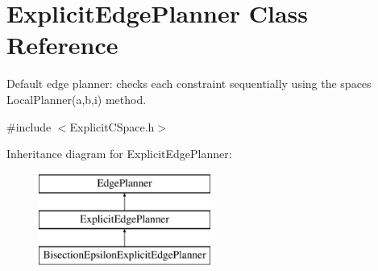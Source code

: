 \section{Explicit\+Edge\+Planner Class Reference}
\label{classExplicitEdgePlanner}


Default edge planner\+: checks each constraint sequentially using the space\textquotesingle{}s Local\+Planner(a,b,i) method.  




{\ttfamily \#include $<$Explicit\+C\+Space.\+h$>$}

Inheritance diagram for Explicit\+Edge\+Planner\+:\begin{figure}[H]
\begin{center}
\leavevmode
\includegraphics[height=3.000000cm]{classExplicitEdgePlanner}
\end{center}
\end{figure}
